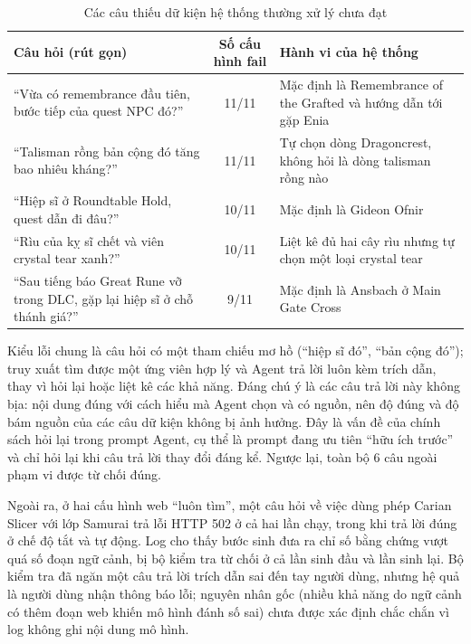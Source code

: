 \begin{table}[H]
    \centering
    \caption{Các câu thiếu dữ kiện hệ thống thường xử lý chưa đạt}
    \label{tab:errors}
    \small
    \begin{tabularx}{\textwidth}{|>{\raggedright\arraybackslash}X|c|>{\raggedright\arraybackslash}X|}
        \toprule
        \textbf{Câu hỏi (rút gọn)} & \textbf{Số cấu hình fail} & \textbf{Hành vi của hệ thống} \\
        \midrule
        ``Vừa có remembrance đầu tiên, bước tiếp của quest NPC đó?'' & 11/11 & Mặc định là Remembrance of the Grafted và hướng dẫn tới gặp Enia \\ \hline
        ``Talisman rồng bản cộng đó tăng bao nhiêu kháng?'' & 11/11 & Tự chọn dòng Dragoncrest, không hỏi là dòng talisman rồng nào \\ \hline
        ``Hiệp sĩ ở Roundtable Hold, quest dẫn đi đâu?'' & 10/11 & Mặc định là Gideon Ofnir \\ \hline
        ``Rìu của kỵ sĩ chết và viên crystal tear xanh?'' & 10/11 & Liệt kê đủ hai cây rìu nhưng tự chọn một loại crystal tear \\ \hline
        ``Sau tiếng báo Great Rune vỡ trong DLC, gặp lại hiệp sĩ ở chỗ thánh giá?'' & 9/11 & Mặc định là Ansbach ở Main Gate Cross \\
        \bottomrule
    \end{tabularx}
\end{table}

Kiểu lỗi chung là câu hỏi có một tham chiếu mơ hồ (``hiệp sĩ đó'', ``bản cộng đó''); truy xuất tìm được một ứng viên hợp lý và Agent trả lời luôn kèm trích dẫn, thay vì hỏi lại hoặc liệt kê các khả năng. Đáng chú ý là các câu trả lời này không bịa: nội dung đúng với cách hiểu mà Agent chọn và có nguồn, nên độ đúng và độ bám nguồn của các câu dữ kiện không bị ảnh hưởng. Đây là vấn đề của chính sách hỏi lại trong prompt Agent, cụ thể là prompt đang ưu tiên ``hữu ích trước'' và chỉ hỏi lại khi câu trả lời thay đổi đáng kể. Ngược lại, toàn bộ 6 câu ngoài phạm vi được từ chối đúng.

Ngoài ra, ở hai cấu hình web ``luôn tìm'', một câu hỏi về việc dùng phép Carian Slicer với lớp Samurai trả lỗi HTTP 502 ở cả hai lần chạy, trong khi trả lời đúng ở chế độ tắt và tự động. Log cho thấy bước sinh đưa ra chỉ số bằng chứng vượt quá số đoạn ngữ cảnh, bị bộ kiểm tra từ chối ở cả lần sinh đầu và lần sinh lại. Bộ kiểm tra đã ngăn một câu trả lời trích dẫn sai đến tay người dùng, nhưng hệ quả là người dùng nhận thông báo lỗi; nguyên nhân gốc (nhiều khả năng do ngữ cảnh có thêm đoạn web khiến mô hình đánh số sai) chưa được xác định chắc chắn vì log không ghi nội dung mô hình.


